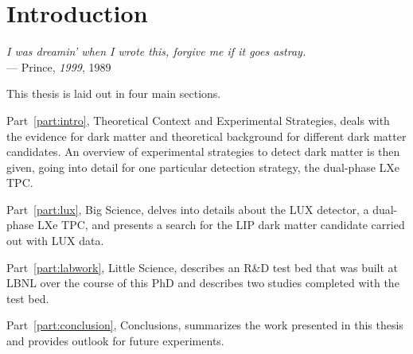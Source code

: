 \chapter{Introduction}\label{ch:introduction} %

\begin{flushright}{\slshape    
    I was dreamin' when I wrote this, forgive me if it goes astray. } \\ \medskip
    --- {Prince, \textit{1999}, 1989}
\end{flushright}

This thesis is laid out in four main sections. 

Part~\ref{part:intro}, Theoretical Context and Experimental Strategies, deals with the evidence for dark matter and theoretical background for different dark matter candidates. An overview of experimental strategies to detect dark matter is then given, going into detail for one particular detection strategy, the dual-phase \ac{LXe} \ac{TPC}.

Part~\ref{part:lux}, Big Science, delves into details about the \ac{LUX} detector, a dual-phase \ac{LXe} \ac{TPC}, and presents a search for the \ac{LIP} dark matter candidate carried out with \ac{LUX} data.

Part~\ref{part:labwork}, Little Science, describes an R\&D test bed that was built at \ac{LBNL} over the course of this PhD and describes two studies completed with the test bed. 

Part~\ref{part:conclusion}, Conclusions, summarizes the work presented in this thesis and provides outlook for future experiments.


